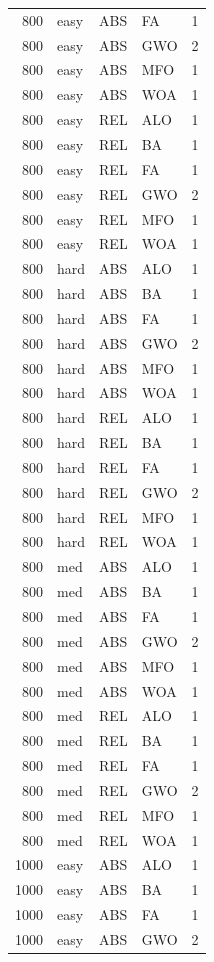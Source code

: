 \begin{tabular}{r l l l l}
800 & easy & ABS & FA & 1 \\
800 & easy & ABS & GWO & 2 \\
800 & easy & ABS & MFO & 1 \\
800 & easy & ABS & WOA & 1 \\
800 & easy & REL & ALO & 1 \\
800 & easy & REL & BA & 1 \\
800 & easy & REL & FA & 1 \\
800 & easy & REL & GWO & 2 \\
800 & easy & REL & MFO & 1 \\
800 & easy & REL & WOA & 1 \\
800 & hard & ABS & ALO & 1 \\
800 & hard & ABS & BA & 1 \\
800 & hard & ABS & FA & 1 \\
800 & hard & ABS & GWO & 2 \\
800 & hard & ABS & MFO & 1 \\
800 & hard & ABS & WOA & 1 \\
800 & hard & REL & ALO & 1 \\
800 & hard & REL & BA & 1 \\
800 & hard & REL & FA & 1 \\
800 & hard & REL & GWO & 2 \\
800 & hard & REL & MFO & 1 \\
800 & hard & REL & WOA & 1 \\
800 & med & ABS & ALO & 1 \\
800 & med & ABS & BA & 1 \\
800 & med & ABS & FA & 1 \\
800 & med & ABS & GWO & 2 \\
800 & med & ABS & MFO & 1 \\
800 & med & ABS & WOA & 1 \\
800 & med & REL & ALO & 1 \\
800 & med & REL & BA & 1 \\
800 & med & REL & FA & 1 \\
800 & med & REL & GWO & 2 \\
800 & med & REL & MFO & 1 \\
800 & med & REL & WOA & 1 \\
1000 & easy & ABS & ALO & 1 \\
1000 & easy & ABS & BA & 1 \\
1000 & easy & ABS & FA & 1 \\
1000 & easy & ABS & GWO & 2 \\

\end{tabular}
